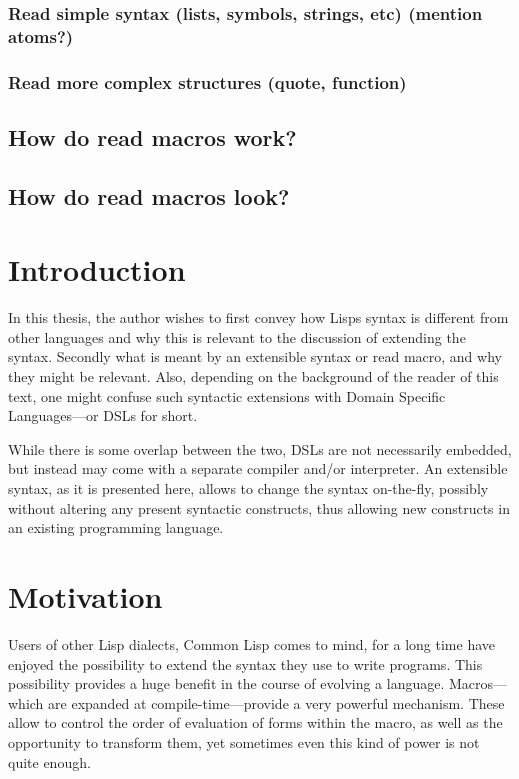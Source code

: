 \documentclass[a4paper]{article}
\begin{document}
\subsubsection{Read simple syntax (lists, symbols, strings, etc) (mention atoms?)}
\label{sec:orgheadline1}
\subsubsection{Read more complex structures (quote, function)}
\label{sec:orgheadline2}
\subsection{How do read macros work?}
\label{sec:orgheadline4}
\subsection{How do read macros look?}
\label{sec:orgheadline5}

\section{Introduction}
\label{sec:orgheadline7}
In this thesis, the author wishes to first convey how Lisps syntax is different
from other languages and why this is relevant to the discussion of extending the
syntax.  Secondly what is meant by an extensible syntax or read macro, and why
they might be relevant.  Also, depending on the background of the reader of this
text, one might confuse such syntactic extensions with Domain Specific
Languages—or DSLs for short.

While there is some overlap between the two, DSLs are not necessarily embedded,
but instead may come with a separate compiler and/or interpreter.  An extensible
syntax, as it is presented here, allows to change the syntax on-the-fly,
possibly without altering any present syntactic constructs, thus allowing new
constructs in an existing programming language.

\section{Motivation}
\label{sec:orgheadline8}
Users of other Lisp dialects, Common Lisp comes to mind, for a long time have
enjoyed the possibility to extend the syntax they use to write programs.  This
possibility provides a huge benefit in the course of evolving a language.
Macros---which are expanded at compile-time---provide a very powerful
mechanism.  These allow to control the order of evaluation of forms within the
macro, as well as the opportunity to transform them, yet sometimes even this
kind of power is not quite enough.
\end{document}
